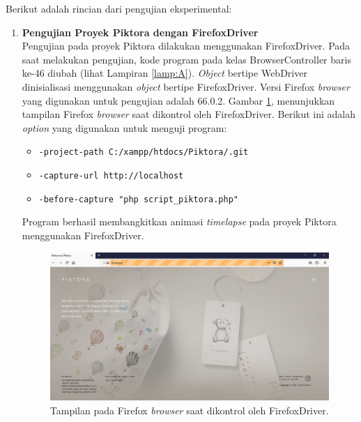 Berikut adalah rincian dari pengujian eksperimental:

\begin{enumerate}
\item \textbf{Pengujian Proyek Piktora dengan FirefoxDriver}\\
Pengujian pada proyek Piktora dilakukan menggunakan FirefoxDriver. Pada saat melakukan pengujian, kode program pada kelas BrowserController baris ke-46  diubah (lihat Lampiran \ref{lamp:A}). \textit{Object} bertipe WebDriver dinisialisasi menggunakan \textit{object} bertipe FirefoxDriver. Versi Firefox \textit{browser} yang digunakan untuk pengujian adalah 66.0.2. Gambar \ref{fig:firefox}, menunjukkan tampilan Firefox \textit{browser} saat dikontrol oleh FirefoxDriver. Berikut ini adalah \textit{option} yang digunakan untuk menguji program:
\begin{itemize}
\item \texttt{-project-path C:/xampp/htdocs/Piktora/.git}
\item \texttt{-capture-url http://localhost}
\item \texttt{-before-capture "php script\_piktora.php"}
\end{itemize}
Program berhasil membangkitkan animasi \textit{timelapse} pada proyek Piktora menggunakan FirefoxDriver.

\begin{figure}[H]
	\centering
		\includegraphics[scale=0.4]{Gambar/Firefox.png}
	\caption{Tampilan pada Firefox \textit{browser} saat dikontrol oleh FirefoxDriver.}
	\label{fig:firefox}
\end{figure}





\end{enumerate}
